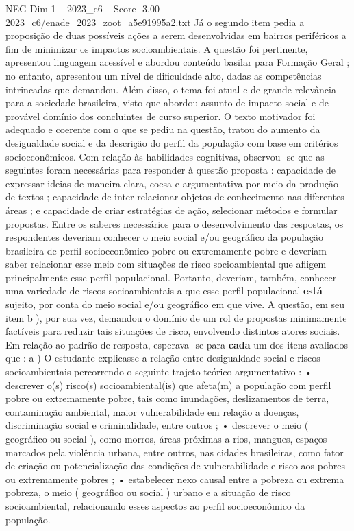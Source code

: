 \begin{textsample}{NEG Dim 1 – 2023\_c6 – Score -3.00 – 2023\_c6/enade\_2023\_zoot\_a5e91995a2.txt}
Já o segundo item pedia a proposição de duas possíveis ações a serem desenvolvidas em bairros periféricos a fim de minimizar os impactos socioambientais.
A questão foi pertinente, apresentou linguagem acessível e abordou conteúdo basilar para Formação Geral ; no entanto, apresentou um nível de dificuldade alto, dadas as competências intrincadas que demandou.
Além disso, o tema foi atual e de grande relevância para a sociedade brasileira, visto que abordou assunto de impacto social e de provável domínio dos concluintes de curso superior.
O texto motivador foi adequado e coerente com o que se pediu na questão, tratou do aumento da desigualdade social e da descrição do perfil da população com base em critérios socioeconômicos.
Com relação às habilidades cognitivas, observou -se que as seguintes foram necessárias para responder à questão proposta : capacidade de expressar ideias de maneira clara, coesa e argumentativa por meio da produção de textos ; capacidade de inter-relacionar objetos de conhecimento nas diferentes áreas ; e capacidade de criar estratégias de ação, selecionar métodos e formular propostas.
Entre os saberes necessários para o desenvolvimento das respostas, os respondentes deveriam conhecer o meio social e/ou geográfico da população brasileira de perfil socioeconômico pobre ou extremamente pobre e deveriam saber relacionar esse meio com situações de risco socioambiental que afligem principalmente esse perfil populacional.
Portanto, deveriam, também, conhecer uma variedade de riscos socioambientais a que esse perfil populacional \textbf{está} sujeito, por conta do meio social e/ou geográfico em que vive.
A questão, em seu item b ), por sua vez, demandou o domínio de um rol de propostas minimamente factíveis para reduzir tais situações de risco, envolvendo distintos atores sociais.
Em relação ao padrão de resposta, esperava -se para \textbf{cada} um dos itens avaliados que : a ) O estudante explicasse a relação entre desigualdade social e riscos socioambientais percorrendo o seguinte trajeto teórico-argumentativo : • descrever o(s) risco(s) socioambiental(is) que afeta(m) a população com perfil pobre ou extremamente pobre, tais como inundações, deslizamentos de terra, contaminação ambiental, maior vulnerabilidade em relação a doenças, discriminação social e criminalidade, entre outros ; • descrever o meio ( geográfico ou social ), como morros, áreas próximas a rios, mangues, espaços marcados pela violência urbana, entre outros, nas cidades brasileiras, como fator de criação ou potencialização das condições de vulnerabilidade e risco aos pobres ou extremamente pobres ; • estabelecer nexo causal entre a pobreza ou extrema pobreza, o meio ( geográfico ou social ) urbano e a situação de risco socioambiental, relacionando esses aspectos ao perfil socioeconômico da população.

\end{textsample}
